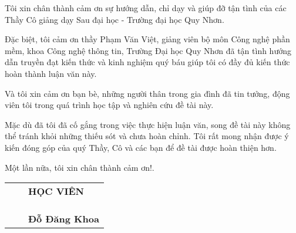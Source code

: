 Tôi xin chân thành cảm ơn sự hướng dẫn, chỉ dạy và giúp đỡ tận tình của các Thầy Cô giảng dạy Sau đại học - Trường đại học Quy Nhơn.

Đặc biệt, tôi cảm ơn thầy Phạm Văn Việt, giảng viên bộ môn Công nghệ phần mềm, khoa Công nghệ thông tin, Trường Đại học Quy Nhơn đã tận tình hướng dẫn truyền đạt kiến thức và kinh nghiệm quý báu giúp tôi có đầy đủ kiến thức hoàn thành luận văn này.

Và tôi xin cảm ơn bạn bè, những người thân trong gia đình đã tin tưởng, động viên tôi trong quá trình học tập và nghiên cứu đề tài này.

Mặc dù đã tôi đã cố gắng trong việc thực hiện luận văn, song đề tài này không thể tránh khỏi những thiếu sót và chưa hoàn chỉnh. Tôi rất mong nhận được ý kiến đóng góp của quý Thầy, Cô và các bạn để đề tài được hoàn thiện hơn.

Một lần nữa, tôi xin chân thành cảm ơn!.\\


\begin{tabu} to 1.0 \textwidth {  X[c] X[c]  X[c]   }

	 & &  \textbf{HỌC VIÊN} \\
	 \\ \\ \\ 
	 & &  \textbf{Đỗ Đăng Khoa}  \\
         
       \end{tabu}



